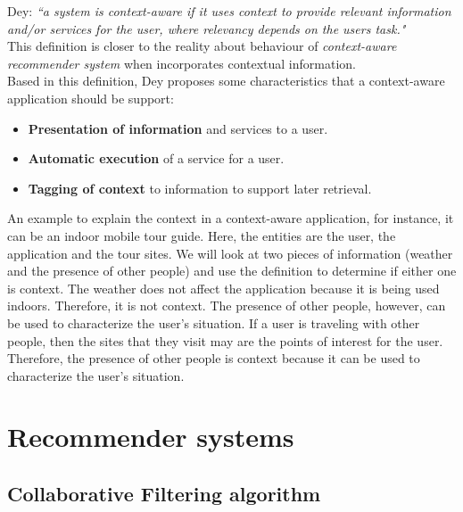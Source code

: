 Dey\cite{dey2001understanding}: \textit{``a system is context-aware if
it uses context to provide relevant information and/or services for
the user, where relevancy  depends on the users task."}\\ This
definition is closer  to the reality about behaviour of \textit
{context-aware recommender system} when incorporates contextual
information.\\  
Based in this definition, Dey proposes some characteristics 
that a context-aware application should be support:
\begin{itemize}  
\item \textbf{Presentation of information} and services to a user.
\item \textbf{Automatic execution} of a service for a user.
\item \textbf{Tagging of context} to information to support later retrieval.
\end{itemize} 
An example to explain the context in a context-aware application, for
instance, it can be an indoor mobile tour guide. Here, the entities
are the user, the application and the tour sites. We will look at two
pieces of information (weather and the presence of other people) and
use the definition to determine if either one is context. The weather
does not affect the application because it is being used indoors.
Therefore, it is not context. The presence of other people, however,
can be used to characterize the user’s situation. If a user is
traveling with other people, then the sites that they visit may are
the points of interest for the user. Therefore, the presence of other
people is context because it can be used to characterize the user's
situation.

\section{Recommender systems}

\subsection{Collaborative Filtering algorithm}

